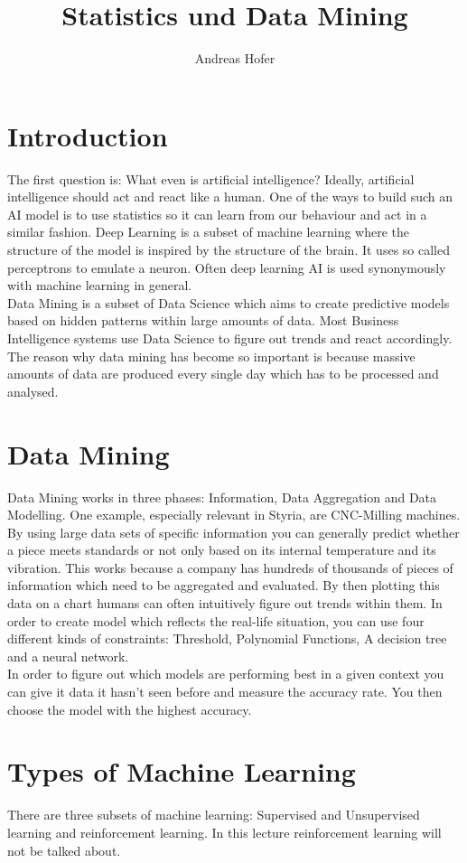 \documentclass{article}
\title{\vspace{-1cm}Statistics und Data Mining}
\author{Andreas Hofer}
\begin{document}
	\maketitle
	\tableofcontents
	\newpage
	\section{Introduction}
	The first question is: What even is artificial intelligence? Ideally, artificial intelligence should act and react like a human. One of the ways to build such an AI model is to use statistics so it can learn from our behaviour and act in a similar fashion. Deep Learning is a subset of machine learning where the structure of the model is inspired by the structure of the brain. It uses so called perceptrons to emulate a neuron. Often deep learning AI is used synonymously with machine learning in general. \\
	Data Mining is a subset of Data Science which aims to create predictive models based on hidden patterns within large amounts of data. Most Business Intelligence systems use Data Science to figure out trends and react accordingly. The reason why data mining has become so important is because massive amounts of data are produced every single day which has to be processed and analysed.
	\section{Data Mining}
	Data Mining works in three phases: Information, Data Aggregation and Data Modelling.
	One example, especially relevant in Styria, are CNC-Milling machines. By using large data sets of specific information you can generally predict whether a piece meets standards or not only based on its internal temperature and its vibration. This works because a company has hundreds of thousands of pieces of information which need to be aggregated and evaluated. By then plotting this data on a chart humans can often intuitively figure out trends within them. In order to create model which reflects the real-life situation, you can use four different kinds of constraints: Threshold, Polynomial Functions, A decision tree and a neural network. \\
	In order to figure out which models are performing best in a given context you can give it data it hasn't seen before and measure the accuracy rate. You then choose the model with the highest accuracy.
	\section{Types of Machine Learning}
	There are three subsets of machine learning: Supervised and Unsupervised learning and reinforcement learning. In this lecture reinforcement learning will not be talked about.
\end{document}

